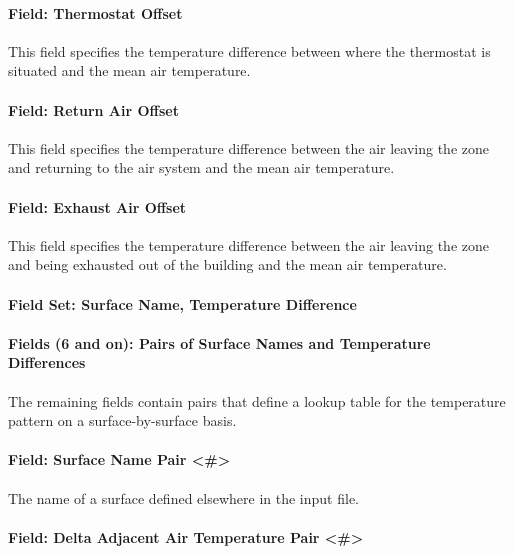 \paragraph{Field: Thermostat Offset}\label{field-thermostat-offset-2}

This field specifies the temperature difference between where the thermostat is situated and the mean air temperature.

\paragraph{Field: Return Air Offset}\label{field-return-air-offset-2}

This field specifies the temperature difference between the air leaving the zone and returning to the air system and the mean air temperature.

\paragraph{Field: Exhaust Air Offset}\label{field-exhaust-air-offset-2}

This field specifies the temperature difference between the air leaving the zone and being exhausted out of the building and the mean air temperature.

\paragraph{Field Set: Surface Name, Temperature Difference}\label{field-set-surface-name-temperature-difference}

\paragraph{Fields (6 and on): Pairs of Surface Names and Temperature Differences}\label{fields-6-and-on-pairs-of-surface-names-and-temperature-differences}

The remaining fields contain pairs that define a lookup table for the temperature pattern on a surface-by-surface basis.

\paragraph{Field: Surface Name Pair \textless{}\#\textgreater{}}\label{field-surface-name-pair}

The name of a surface defined elsewhere in the input file.

\paragraph{Field: Delta Adjacent Air Temperature Pair \textless{}\#\textgreater{}}\label{field-delta-adjacent-air-temperature-pair}

